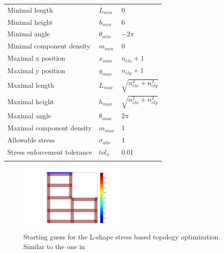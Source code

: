 \begin{table}[h!]
\begin{tabular}{lll}
 Minimal length& $L_{min}$ & 0\\
 Minimal height & $h_{min}$ & 6\\
 Minimal angle & $\theta_{min}$ & $-2\pi$\\
 Minimal component density & $m_{min}$ & 0\\
 Maximal x position & $x_{max}$ & $n_{elx}+1$\\
 Maximal y position & $y_{max}$ & $n_{ely}+1$\\
 Maximal length& $L_{max}$ & $\sqrt{n_{elx}^2+n_{ely}^2}$\\
 Maximal height & $h_{max}$ & $\sqrt{n_{elx}^2+n_{ely}^2}$\\
 Maximal angle & $\theta_{max}$ & $2\pi$\\
 Maximal component density & $m_{max}$ & 1\\
 Allowable stress & $\sigma_{alw}$ & 1\\
 Stress enforcement tolerance & $tol_{\sigma}$ & 0.01\\
 \noalign{\smallskip}\hline
 \end{tabular}
\end{table}
\begin{figure}[!h]
\centering
  \includegraphics[width=0.5\textwidth]{images/Ch3/initial_guess_-01.png}
\caption{Starting guess for the L-shape stress based topology optimization. Similar to the one in \cite{zhang2017stress}}
\label{fig:initial}       %
\end{figure}
